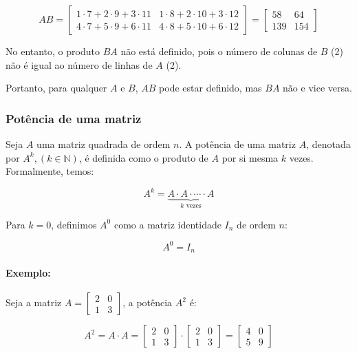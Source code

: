 \[ 
    AB = \begin{bmatrix}
        1 \cdot 7 + 2 \cdot 9 + 3 \cdot 11 & 1 \cdot 8 + 2 \cdot 10 + 3 \cdot 12 \\ 
        4 \cdot 7 + 5 \cdot 9 + 6 \cdot 11 & 4 \cdot 8 + 5 \cdot 10 + 6 \cdot 12
    \end{bmatrix} = \begin{bmatrix}
        58 & 64 \\ 
        139 & 154
    \end{bmatrix}
\]

No entanto, o produto $BA$ não está definido, pois o número de colunas de $B$ (2) não é igual ao número de linhas de $A$ (2).

\begin{center}
    Portanto, para qualquer $A$ e $B$, $AB$ pode estar definido, mas $BA$ não e vice versa.
\end{center}

\subsubsection{Potência de uma matriz}
\indent

Seja $A$ uma matriz quadrada de ordem $n$. A potência de uma matriz $A$, denotada por $A^k, (k \in \mathbb{N})$, é definida como o produto de $A$ por si mesma $k$ vezes. Formalmente, temos:

\[
    A^k = \underbrace{A \cdot A \cdot \cdots \cdot A}_{k \text{ vezes}}
\]

Para $k = 0$, definimos $A^0$ como a matriz identidade $I_n$ de ordem $n$:

\[
    A^0 = I_n
\]

\paragraph{Exemplo:}

Seja a matriz $A = \begin{bmatrix}
    2 & 0 \\ 
    1 & 3
\end{bmatrix}$, a potência $A^2$ é:

\[
    A^2 = A \cdot A = \begin{bmatrix}
        2 & 0 \\ 
        1 & 3
    \end{bmatrix} \cdot \begin{bmatrix}
        2 & 0 \\ 
        1 & 3
    \end{bmatrix} = \begin{bmatrix}
        4 & 0 \\ 
        5 & 9
    \end{bmatrix}
\]

